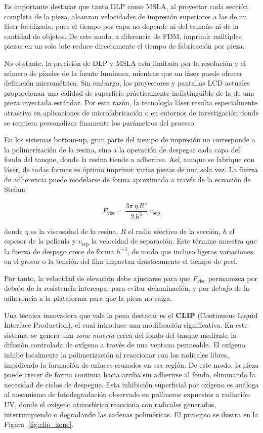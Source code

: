 Es importante destacar que tanto DLP como MSLA, al proyectar cada sección completa de la pieza, alcanzan velocidades de impresión superiores a las de un láser focalizado, pues el tiempo por capa no depende ni del tamaño ni de la cantidad de objetos. De este modo, a diferencia de FDM, imprimir múltiples piezas en un solo lote reduce directamente el tiempo de fabricación por pieza.

No obstante, la precisión de DLP y MSLA está limitada por la resolución y el número de píxeles de la fuente luminosa, mientras que un láser puede ofrecer definición micrométrica. Sin embargo, los proyectores y pantallas LCD actuales proporcionan una calidad de superficie prácticamente indistinguible de la de una pieza inyectada estándar. Por esta razón, la tecnología láser resulta especialmente atractiva en aplicaciones de microfabricación o en entornos de investigación donde se requiera personalizar finamente los parámetros del proceso.

En los sistemas bottom-up, gran parte del tiempo de impresión no corresponde a la polimerización de la resina, sino a la operación de despegar cada capa del fondo del tanque, donde la resina tiende a adherirse. Así, aunque se fabrique con láser, de todas formas es óptimo imprimir varias piezas de una sola vez. La fuerza de adherencia puede modelarse de forma aproximada a través de la ecuación de Stefan:

\begin{equation} 
F_{\mathrm{visc}} 	= \frac{3\pi\,\eta\,R^4}{2\,h^3}\;v_{\mathrm{sep}} 
\end{equation}

donde $\eta$ es la viscosidad de la resina, $R$ el radio efectivo de la sección, $h$ el espesor de la película y $v_{\mathrm{sep}}$ la velocidad de separación. Este término muestra que la fuerza de despego crece de forma $h^{-3}$, de modo que incluso ligeras variaciones en el grosor o la tensión del film impactan drásticamente el tiempo de peel.

Por tanto, la velocidad de elevación debe ajustarse para que $F_{\mathrm{visc}}$ permanezca por debajo de la resistencia intercapa, para evitar delaminación, y por debajo de la adherencia a la plataforma para que la pieza no caiga.

Una técnica innovadora que vale la pena destacar es el \textbf{CLIP} (Continuous Liquid Interface Production), el cual introduce una modificación significativa. En este sistema, se genera una \textit{zona muerta} cerca del fondo del tanque mediante la difusión controlada de oxígeno a través de una ventana permeable. El oxígeno inhibe localmente la polimerización al reaccionar con los radicales libres, impidiendo la formación de enlaces cruzados en esa región. De este modo, la pieza puede crecer de forma continua hacia arriba sin adherirse al fondo, eliminando la necesidad de ciclos de despegue. Esta inhibición superficial por oxígeno es análoga al mecanismo de fotodegradación observado en polímeros expuestos a radiación UV, donde el oxígeno atmosférico reacciona con radicales generados, interrumpiendo o degradando las cadenas poliméricas. El principio se ilustra en la Figura~\ref{fig:clip_zone}.

